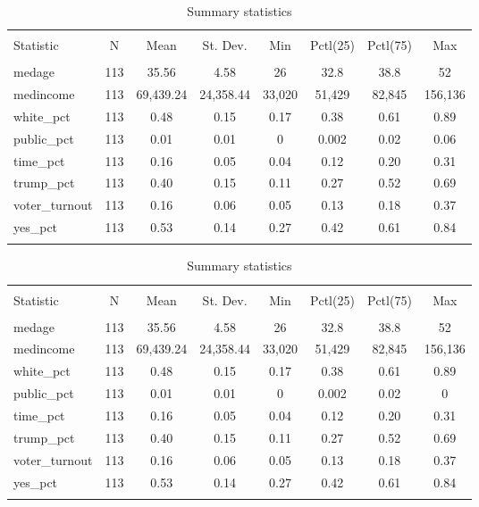 \documentclass[
]{article}
\begin{document}
\begin{table}[!htbp] \centering 
  \caption{Summary statistics} 
  \label{summaryStats} 
\begin{tabular}{@{\extracolsep{5pt}}lccccccc} 
\\[-1.8ex]\hline 
\hline \\[-1.8ex] 
Statistic & \multicolumn{1}{c}{N} & \multicolumn{1}{c}{Mean} & \multicolumn{1}{c}{St. Dev.} & \multicolumn{1}{c}{Min} & \multicolumn{1}{c}{Pctl(25)} & \multicolumn{1}{c}{Pctl(75)} & \multicolumn{1}{c}{Max} \\ 
\hline \\[-1.8ex] 
medage & 113 & 35.56 & 4.58 & 26 & 32.8 & 38.8 & 52 \\ 
medincome & 113 & 69,439.24 & 24,358.44 & 33,020 & 51,429 & 82,845 & 156,136 \\ 
white\_pct & 113 & 0.48 & 0.15 & 0.17 & 0.38 & 0.61 & 0.89 \\ 
public\_pct & 113 & 0.01 & 0.01 & 0 & 0.002 & 0.02 & 0.06 \\ 
time\_pct & 113 & 0.16 & 0.05 & 0.04 & 0.12 & 0.20 & 0.31 \\ 
trump\_pct & 113 & 0.40 & 0.15 & 0.11 & 0.27 & 0.52 & 0.69 \\ 
voter\_turnout & 113 & 0.16 & 0.06 & 0.05 & 0.13 & 0.18 & 0.37 \\ 
yes\_pct & 113 & 0.53 & 0.14 & 0.27 & 0.42 & 0.61 & 0.84 \\ 
\hline \\[-1.8ex] 
\end{tabular} 
\end{table}

\begin{table}[!htbp] \centering 
  \caption{Summary statistics} 
  \label{summaryStats} 
\begin{tabular}{@{\extracolsep{5pt}}lccccccc} 
\\[-1.8ex]\hline 
\hline \\[-1.8ex] 
Statistic & \multicolumn{1}{c}{N} & \multicolumn{1}{c}{Mean} & \multicolumn{1}{c}{St. Dev.} & \multicolumn{1}{c}{Min} & \multicolumn{1}{c}{Pctl(25)} & \multicolumn{1}{c}{Pctl(75)} & \multicolumn{1}{c}{Max} \\ 
\hline \\[-1.8ex] 
medage & 113 & 35.56 & 4.58 & 26 & 32.8 & 38.8 & 52 \\ 
medincome & 113 & 69,439.24 & 24,358.44 & 33,020 & 51,429 & 82,845 & 156,136 \\ 
white\_pct & 113 & 0.48 & 0.15 & 0.17 & 0.38 & 0.61 & 0.89 \\ 
public\_pct & 113 & 0.01 & 0.01 & 0 & 0.002 & 0.02 & 0 \\ 
time\_pct & 113 & 0.16 & 0.05 & 0.04 & 0.12 & 0.20 & 0.31 \\ 
trump\_pct & 113 & 0.40 & 0.15 & 0.11 & 0.27 & 0.52 & 0.69 \\ 
voter\_turnout & 113 & 0.16 & 0.06 & 0.05 & 0.13 & 0.18 & 0.37 \\ 
yes\_pct & 113 & 0.53 & 0.14 & 0.27 & 0.42 & 0.61 & 0.84 \\ 
\hline \\[-1.8ex] 
\end{tabular} 
\end{table}
\end{document}
